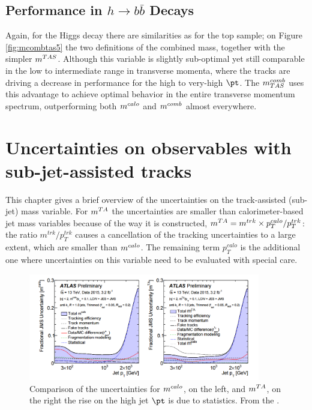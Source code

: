 \subsection{Performance in $h\to b\bar{b}$ Decays}
Again, for the Higgs decay there are similarities as for the top sample; on Figure \ref{fig:mcombtas5} the two definitions of the combined mass, together with the simpler $m^{TAS}$. Although this variable is slightly sub-optimal yet still comparable in the low to intermediate range in transverse momenta, where the tracks are driving a decrease in performance for the high to very-high $\pt$. The $m^{comb}_{TAS}$ uses this advantage to achieve optimal behavior in the entire transverse momentum spectrum, outperforming both $\mcal$ and $m^{comb}$ almost everywhere.


\section{Uncertainties on observables with sub-jet-assisted tracks}
This chapter gives a brief overview of the uncertainties on the track-assisted (sub-jet) mass variable. 
For $\mta$ the uncertainties are smaller than calorimeter-based jet mass variables because of the way it is constructed, $m^{TA}=m^{trk}\times p_T^{calo}/p_T^{trk}$: the ratio $m^{trk}/p_T^{trk}$ causes a cancellation of the tracking uncertainties to a large extent, which are smaller than $\mcal$. The remaining term $p_T^{calo}$ is the additional one where uncertainties on this variable need to be evaluated with special care.

\begin{figure}[!ht]
  \centering
      \includegraphics[width=0.9\textwidth]{jet_part/uncert.png}
  \caption[Comparison of the uncertainties for $\mcal$ and $\mta$]{Comparison of the uncertainties for $\mcal$, on the left, and $\mta$, on the right the rise on the high jet $\pt$ is due to statistics. From the \cite{art35}.}
  \label{fig:uncert}
\end{figure}


